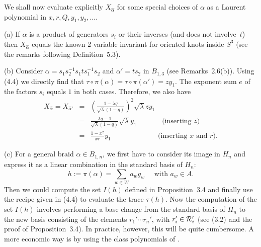 \begin{exmp} {\rm We shall now evaluate explicitly $X_{\widehat{\alpha}}$  
for some special choices of $\alpha$ as a Laurent polynomial in 
$x,r,Q,y_1,y_2,\ldots$.

\medskip
\noindent (a) If $\alpha$ is a product of generators $s_i$ or their inverses
(and does not involve~$t$) then $X_{\widehat{\alpha}}$ equals the known
2-variable invariant for oriented knots inside $S^3$ (see the remarks 
following Definition~5.3).

\medskip
\noindent (b) Consider $\alpha=s_1s_2^{-1}s_1ts_1^{-1}s_2$ and $\alpha'=ts_2$ 
in $B_{1,3}$ (see Remarks~2.6(b)). Using (4.4) we directly find that
$\tau \circ \pi (\alpha)=\tau \circ \pi(\alpha')=zy_1$. The exponent sum
$e$ of the factors $s_i$ equals $1$ in both cases. Therefore, we also
have \begin{eqnarray*}  X_{\widehat{\alpha}}=X_{\widehat{\alpha}'} & = & 
\left(\frac{1-\lambda q}{\sqrt{\lambda}(1-q)} \right)^2 \sqrt{\lambda}zy_1 \\
& = & \frac{\lambda q-1}{\sqrt{\lambda}(1-q)} \sqrt{\lambda}y_1 
\;\;\;\;\;\;\;\;\;\;\;\;\; \mbox{(inserting $z$)}\\
& = & \frac{1-x^2}{xr}y_1 
\;\;\;\;\;\;\;\;\;\;\;\;\;\;\;\;\;\;\;\;\;\;\;\; \mbox{(inserting 
$x$ and $r$).}
\end{eqnarray*}

\medskip
\noindent (c) For a general braid $\alpha \in B_{1,n}$, we first have to
consider its image in $H_n$ and express it as a linear combination in the 
standard basis of $H_n$:
\[h:=\pi(\alpha)=\sum_{w \in W} a_w g_w \quad \mbox{ with $a_w \in A$.}\]
Then we could compute the set $I(h)$ defined in Proposition~3.4 and 
finally use the recipe given in (4.4) to evaluate the trace $\tau(h)$.
Now the computation of the set $I(h)$ involves performing a base change
from the standard basis of $H_n$ to the new basis consisting of the elements
$r_1' \cdots r_n'$, with $r_i' \in {\cal R}_i'$ (see (3.2) and the proof of
Proposition~3.4). In practice, however, this will be quite cumbersome. 
A more economic way is by using the class polynomials of \cite{GP}. 

}
\end{exmp}

